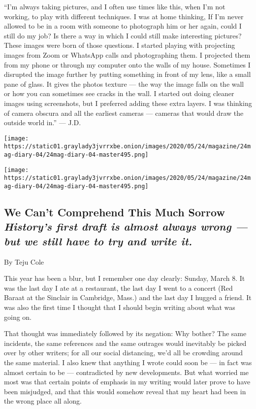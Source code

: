 ``I'm always taking pictures, and I often use times like this, when I'm
not working, to play with different techniques. I was at home thinking,
If I'm never allowed to be in a room with someone to photograph him or
her again, could I still do my job? Is there a way in which I could
still make interesting pictures? These images were born of those
questions. I started playing with projecting images from Zoom or
WhatsApp calls and photographing them. I projected them from my phone or
through my computer onto the walls of my house. Sometimes I disrupted
the image further by putting something in front of my lens, like a small
pane of glass. It gives the photos texture --- the way the image falls
on the wall or how you can sometimes see cracks in the wall. I started
out doing cleaner images using screenshots, but I preferred adding these
extra layers. I was thinking of camera obscura and all the earliest
cameras --- cameras that would draw the outside world in.'' --- J.D.

\texttt{[image: https://static01.graylady3jvrrxbe.onion/images/2020/05/24/magazine/24mag-diary-04/24mag-diary-04-master495.png]}

\texttt{[image: https://static01.graylady3jvrrxbe.onion/images/2020/05/24/magazine/24mag-diary-04/24mag-diary-04-master495.png]}

\hypertarget{we-cant-comprehend-this-much-sorrow-historys-first-draft-is-almost-always-wrong--but-we-still-have-to-try-and-write-it}{%
\subsection{\texorpdfstring{We Can't Comprehend This Much Sorrow
\emph{History's first draft is almost always wrong --- but we still have
to try and write
it.}}{We Can't Comprehend This Much Sorrow History's first draft is almost always wrong --- but we still have to try and write it.}}\label{we-cant-comprehend-this-much-sorrow-historys-first-draft-is-almost-always-wrong--but-we-still-have-to-try-and-write-it}}

By Teju Cole

This year has been a blur, but I remember one day clearly: Sunday, March
8. It was the last day I ate at a restaurant, the last day I went to a
concert (Red Baraat at the Sinclair in Cambridge, Mass.) and the last
day I hugged a friend. It was also the first time I thought that I
should begin writing about what was going on.

That thought was immediately followed by its negation: Why bother? The
same incidents, the same references and the same outrages would
inevitably be picked over by other writers; for all our social
distancing, we'd all be crowding around the same material. I also knew
that anything I wrote could soon be --- in fact was almost certain to be
--- contradicted by new developments. But what worried me most was that
certain points of emphasis in my writing would later prove to have been
misjudged, and that this would somehow reveal that my heart had been in
the wrong place all along.

